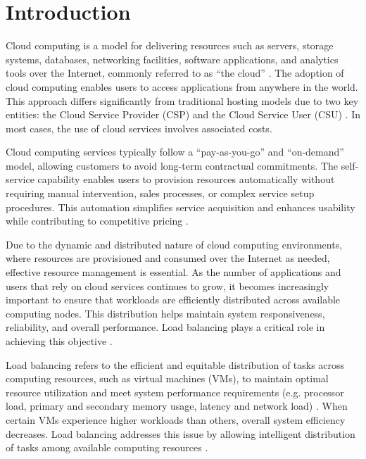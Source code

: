 \documentclass[pdflatex,sn-mathphys-num]{sn-jnl}%
\theoremstyle{thmstyleone}%
\theoremstyle{thmstyletwo}%
\theoremstyle{thmstylethree}%
\begin{document}
\maketitle
\clearpage

\section{Introduction}\label{sec1}
Cloud computing is a model for delivering resources such as servers, storage systems, databases, networking facilities, software applications, and analytics tools over the Internet, commonly referred to as “the cloud” \cite{cloudComputing}. The adoption of cloud computing enables users to access applications from anywhere in the world. This approach differs significantly from traditional hosting models due to two key entities: the Cloud Service Provider (CSP) and the Cloud Service User (CSU) \cite{bib2}. In most cases, the use of cloud services involves associated costs.

Cloud computing services typically follow a “pay-as-you-go” and “on-demand” model, allowing customers to avoid long-term contractual commitments. The self-service capability enables users to provision resources automatically without requiring manual intervention, sales processes, or complex service setup procedures. This automation simplifies service acquisition and enhances usability while contributing to competitive pricing \cite{cloudComputing2}.

Due to the dynamic and distributed nature of cloud computing environments, where resources are provisioned and consumed over the Internet as needed, effective resource management is essential. As the number of applications and users that rely on cloud services continues to grow, it becomes increasingly important to ensure that workloads are efficiently distributed across available computing nodes. This distribution helps maintain system responsiveness, reliability, and overall performance. Load balancing plays a critical role in achieving this objective \cite{bib3}.

Load balancing refers to the efficient and equitable distribution of tasks across computing resources, such as virtual machines (VMs), to maintain optimal resource utilization and meet system performance requirements (e.g. processor load, primary and secondary memory usage, latency and network load) \cite{loadBalancing}. When certain VMs experience higher workloads than others, overall system efficiency decreases. Load balancing addresses this issue by allowing intelligent distribution of tasks among available computing resources \cite{bib6}.
\end{document}

